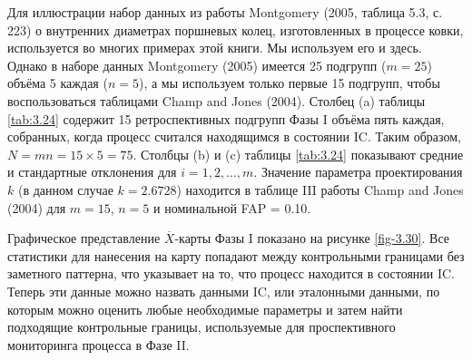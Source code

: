 Для иллюстрации набор данных из работы Montgomery (2005, таблица 5.3, с. 223) о внутренних диаметрах поршневых колец, изготовленных в процессе ковки, используется во многих примерах этой книги. Мы используем его и здесь. Однако в наборе данных Montgomery (2005) имеется 25 подгрупп (\(m = 25\)) объёма 5 каждая (\(n = 5\)), а мы используем только первые 15 подгрупп, чтобы воспользоваться таблицами Champ and Jones (2004). Столбец (a) таблицы \ref{tab:3.24} содержит 15 ретроспективных подгрупп Фазы I объёма пять каждая, собранных, когда процесс считался находящимся в состоянии IC. Таким образом, \(N = mn = 15 \times 5 = 75\). Столбцы (b) и (c) таблицы \ref{tab:3.24} показывают средние и стандартные отклонения для \(i = 1, 2, \ldots, m\). Значение параметра проектирования \(k\) (в данном случае \(k = 2.6728\)) находится в таблице III работы Champ and Jones (2004) для \(m = 15\), \(n = 5\) и номинальной FAP = 0.10.

Графическое представление \(\overline{X}\)-карты Фазы I показано на рисунке \ref{fig-3.30}. Все статистики для нанесения на карту попадают между контрольными границами без заметного паттерна, что указывает на то, что процесс находится в состоянии IC. Теперь эти данные можно назвать данными IC, или эталонными данными, по которым можно оценить любые необходимые параметры и затем найти подходящие контрольные границы, используемые для проспективного мониторинга процесса в Фазе II.

